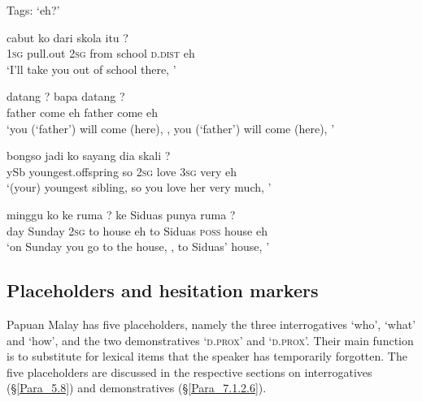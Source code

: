 \begin{styleExampleTitle}
Tags:  ‘eh?’
\end{styleExampleTitle}

\ea
\label{Example_5.333}
 {cabut} {ko} {dari} {skola} {itu} {?}\\ %
 \textsc{1sg}  pull.out  \textsc{2sg}  from  school  \textsc{d.dist}  eh\\
\glt 
‘I’ll take you out of school there, ’ \textstyleExampleSource{[080922-001a-CvPh.0199]}
\z

\ea
\label{Example_5.334}
 {datang} {?} {bapa} {datang} {?}\\ %
 father  come  eh  father  come  eh\\
\glt 
‘you (‘father’) will come (here), , you (‘father’) will come (here), ’ \textstyleExampleSource{[080922-001a-CvPh.1072]}
\z

\ea
\label{Example_5.335}
 {bongso} {jadi} {ko} {sayang} {dia} {skali} {?}\\ %
 ySb  youngest.offspring  so  \textsc{2sg}  love  \textsc{3sg}  very  eh\\
\glt 
‘(your) youngest sibling, so you love her very much, ’ \textstyleExampleSource{[080922-001a-CvPh.0302]}
\z

\ea
\label{Example_5.336}
 {minggu} {ko} {ke} {ruma} {?} {ke} {Siduas} {punya} {ruma} {?}\\ %
 day  Sunday  \textsc{2sg}  to  house  eh  to  Siduas  \textsc{poss}  house  eh\\
\glt
‘on Sunday you go to the house, , to Siduas’ house, ’ \textstyleExampleSource{[080922-001a-CvPh.0341]}
\z


\subsection{Placeholders and hesitation markers}
\label{Para_5.13.2}
Papuan Malay has five placeholders, namely the three interrogatives  ‘who’,  ‘what’ and  ‘how’, and the two demonstratives  ‘\textsc{d.prox}’ and  ‘\textsc{d.prox}’. Their main function is to substitute for lexical items that the speaker has temporarily forgotten. The five placeholders are discussed in the respective sections on interrogatives (§\ref{Para_5.8}) and demonstratives (§\ref{Para_7.1.2.6}).


